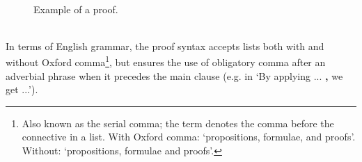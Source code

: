\documentclass[manual.tex]{subfiles}
\begin{document}
\begin{figure}[!hb]
\sffamily
 ~\vspace{-5mm}
\caption{Example of a proof.}
\label{ex:proof}
\end{figure}

\\
 In terms of English grammar, the proof syntax accepts lists both with and
 without Oxford comma\footnote{Also known as the serial comma; the term
 denotes the comma before the connective in a list. 
 With Oxford comma: `propositions, formulae, and proofs'. 
 Without: `propositions, formulae and proofs'.},
 but ensures the use of obligatory comma after an adverbial phrase
 when it precedes the main clause (e.g. in `By applying ... {\bf ,} we get
 ...'). 
\end{document}
